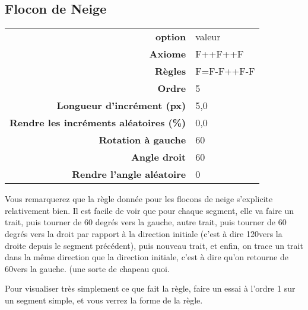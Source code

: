 \documentclass[a4paper,twoside]{article}
\begin{document}
\subsection{Flocon de Neige}
\begin{tabular}{>{\bfseries}r<{}@{ : }p{6cm}}
option &	valeur\\
Axiome & F++F++F\\
Règles & F=F-F++F-F\\
Ordre & 5\\
Longueur d'incrément (px) & 5,0\\
Rendre les incréments aléatoires (\%) & 0,0\\
Rotation à gauche & 60\\
Angle droit & 60 \\
Rendre l'angle aléatoire & 0
\end{tabular}

\begin{remarque}
Vous remarquerez que la règle donnée pour les flocons de neige s'explicite relativement bien. Il est facile de voir que pour chaque segment, elle va faire un trait, puis tourner de 60 degrés vers la gauche, autre trait, puis tourner de 60 degrés vers la droit par rapport à la direction initiale (c'est à dire 120\degre vers la droite depuis le segment précédent), puis nouveau trait, et enfin, on trace un trait dans la même direction que la direction initiale, c'est à dire qu'on retourne de 60\degre vers la gauche. (une sorte de chapeau quoi.

Pour visualiser très simplement ce que fait la règle, faire un essai à l'ordre 1 sur un segment simple, et vous verrez la forme de la règle.
\end{remarque}



\printindex
\end{document}
